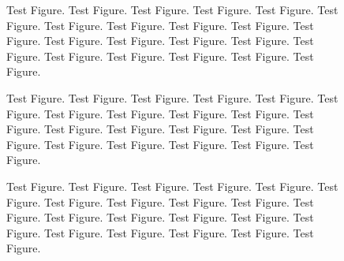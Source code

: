 \lipsum[2]

\lipsum[2]

\begin{figure}[th]
\begin{center}
\end{center}

\caption{Test Figure. Test Figure. Test Figure. Test Figure. Test Figure. Test
Figure. Test Figure. Test Figure. Test Figure. Test Figure. Test Figure.
Test Figure. Test Figure. Test Figure. Test Figure. Test Figure. Test
Figure. Test Figure. Test Figure. Test Figure. Test Figure.}
\end{figure}


\lipsum[2]

\lipsum[2]

\begin{figure}[th]
\begin{center}
\end{center}

\caption{Test Figure. Test Figure. Test Figure. Test Figure. Test Figure. Test
Figure. Test Figure. Test Figure. Test Figure. Test Figure. Test Figure.
Test Figure. Test Figure. Test Figure. Test Figure. Test Figure. Test
Figure. Test Figure. Test Figure. Test Figure. Test Figure.}
\end{figure}


\lipsum[2]

\begin{figure}[th]
\begin{center}
\end{center}

\caption{Test Figure. Test Figure. Test Figure. Test Figure. Test Figure. Test
Figure. Test Figure. Test Figure. Test Figure. Test Figure. Test Figure.
Test Figure. Test Figure. Test Figure. Test Figure. Test Figure. Test
Figure. Test Figure. Test Figure. Test Figure. Test Figure.}
\end{figure}


\lipsum[2]
